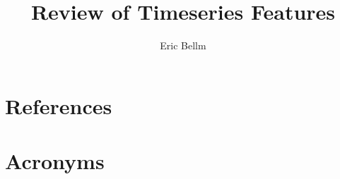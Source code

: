 \documentclass[DM,authoryear,toc]{lsstdoc}
\title{Review of Timeseries Features}
\author{%
Eric Bellm
}
\date{\vcsDate}
\begin{document}
\maketitle


\appendix
\section{References} \label{sec:bib}


\section{Acronyms} \label{sec:acronyms}

\end{document}
